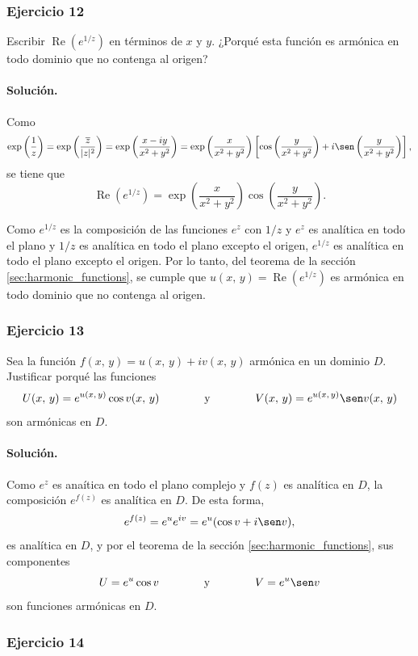 \documentclass[a4paper]{report}
\renewcommand{\Re}{\operatorname{Re}}
\begin{document}
\subsubsection{Ejercicio 12}

Escribir \(\Re(e^{1/z})\) en términos de \(x\) y \(y\). ¿Porqué esta función es armónica en todo dominio que no contenga al origen?

\paragraph{Solución.} Como
\[
 \exp\left(\frac{1}{z}\right)=\exp\left(\frac{\overline{z}}{|z|^2}\right)
 =\exp\left(\frac{x-iy}{x^2+y^2}\right)
 =\exp\left(\frac{x}{x^2+y^2}\right)\left[\cos\left(\frac{y}{x^2+y^2}\right)+i\sen\left(\frac{y}{x^2+y^2}\right)\right],
\]
se tiene que 
\[
 \Re(e^{1/z})=\exp\left(\frac{x}{x^2+y^2}\right)\cos\left(\frac{y}{x^2+y^2}\right).
\]

Como \(e^{1/z}\) es la composición de las funciones \(e^z\) con \(1/z\) y \(e^z\) es analítica en todo el plano y \(1/z\) es analítica en todo el plano excepto el origen, \(e^{1/z}\) es analítica en todo el plano excepto el origen. Por lo tanto, del teorema de la sección \ref{sec:harmonic_functions}, se cumple que \(u(x,\,y)=\Re(e^{1/z})\) es armónica en todo dominio que no contenga al origen.

\subsubsection{Ejercicio 13}

Sea la función \(f(x,\,y)=u(x,\,y)+iv(x,\,y)\) armónica en un dominio \(D\). Justificar porqué las funciones
\[
 U(x,\,y)=e^{u(x,\,y)}\cos v(x,\,y)
 \qquad\qquad\textrm{y}\qquad\qquad
 V(x,\,y)=e^{u(x,\,y)}\sen v(x,\,y)
\]
son armónicas en \(D\).

\paragraph{Solución.} Como \(e^z\) es anaítica en todo el plano complejo y \(f(z)\) es analítica en \(D\), la composición \(e^{f(z)}\) es analítica en \(D\). De esta forma,
\[
 e^{f(z)}=e^ue^{iv}=e^u(\cos v+i\sen v),
\]
es analítica en \(D\), y por el teorema de la sección \ref{sec:harmonic_functions}, sus componentes
\[
 U=e^u\cos v
 \qquad\qquad\textrm{y}\qquad\qquad
 V=e^u\sen v
\]
son funciones armónicas en \(D\). 

\subsubsection{Ejercicio 14}
\end{document}
